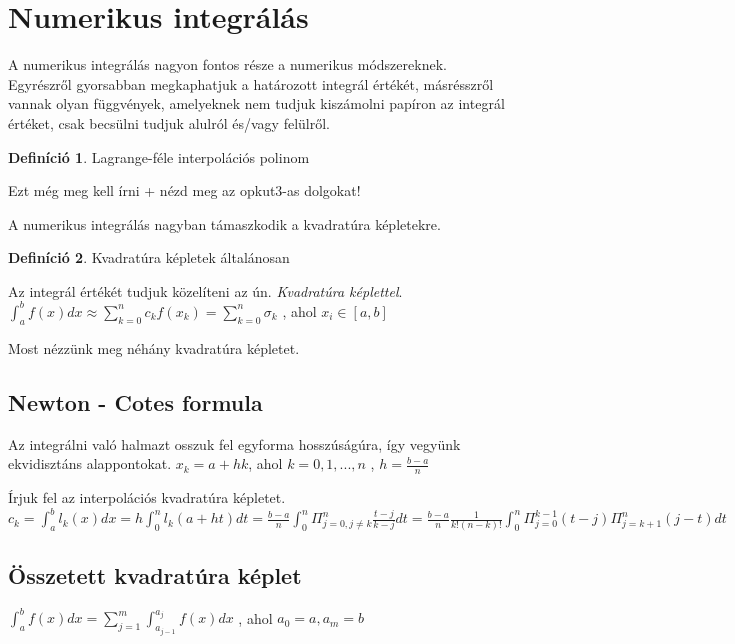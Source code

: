 \documentclass{article}
\theoremstyle{definition}
\newtheorem{definition}{Definíció}
\begin{document}
\section{Numerikus integrálás}
A numerikus integrálás nagyon fontos része a numerikus módszereknek. Egyrészről gyorsabban megkaphatjuk a határozott  integrál értékét, másrésszről vannak olyan függvények, amelyeknek nem tudjuk kiszámolni papíron az integrál értéket, csak becsülni tudjuk alulról és/vagy felülről.

\begin{definition}
Lagrange-féle interpolációs polinom

Ezt még meg kell írni + nézd meg az opkut3-as dolgokat!
\end{definition}
A numerikus integrálás nagyban támaszkodik a kvadratúra képletekre.
\begin{definition}
Kvadratúra képletek általánosan

Az integrál értékét tudjuk közelíteni az ún. \textit{Kvadratúra képlettel}. 
\newline
$\int_{a}^{b} f(x) dx \approx \sum_{k = 0}^{n} c_k f(x_k) = \sum_{k=0}^n \sigma_k$ , ahol $x_i \in [a,b]$
\end{definition}

Most nézzünk meg néhány kvadratúra képletet.
\subsection{Newton - Cotes formula}


Az integrálni való halmazt osszuk fel egyforma hosszúságúra, így vegyünk ekvidisztáns alappontokat.
$x_k = a + hk $, ahol $k=0,1,...,n$ , $h = \frac{b-a}{n}$

Írjuk fel az interpolációs kvadratúra képletet.
\newline
$c_k = \int_a^{b} l_k(x) dx = h \int_0^{n} l_k (a+ht) dt = \frac{b-a}{n} \int_0 ^{n} \Pi_{j=0, j \neq k}^n \frac{t-j}{k-j} dt = \frac{b-a}{n} \frac{1}{k! (n-k)!} \int_0^n \Pi_{j=0}^{k-1} (t-j) \Pi_{j=k+1}^{n} (j-t) dt$


\subsection{Összetett kvadratúra képlet}

\begin{center}
 $\int_a^{b} f(x) dx = \sum_{j = 1} ^{m} \int_{a_{j-1}} ^{a_j} f(x) dx$ , ahol $a_0 = a, a_m =b$   
\end{center}
\end{document}
